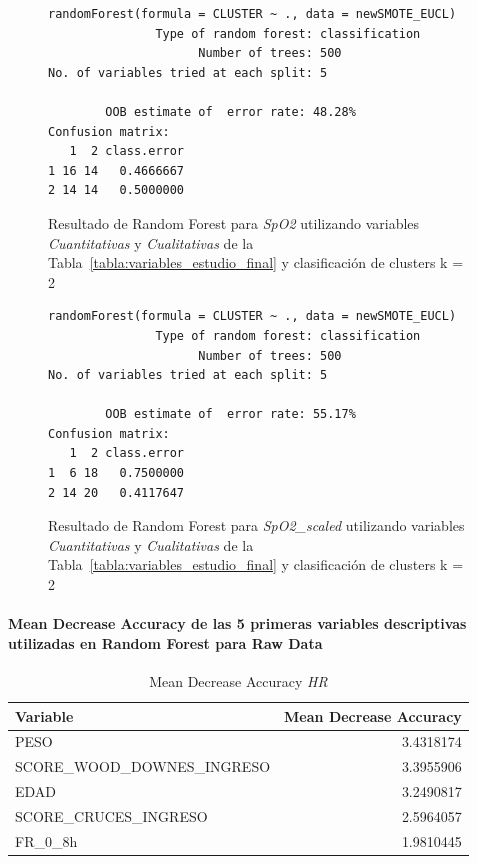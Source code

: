 \begin{figure}[H]
    \centering
    \begin{lstlisting}[frame=single, basicstyle=\small\ttfamily]
        randomForest(formula = CLUSTER ~ ., data = newSMOTE_EUCL) 
               Type of random forest: classification
                     Number of trees: 500
No. of variables tried at each split: 5

        OOB estimate of  error rate: 48.28%
Confusion matrix:
   1  2 class.error
1 16 14   0.4666667
2 14 14   0.5000000
    \end{lstlisting}
    \caption{Resultado de Random Forest para \textit{SpO2} utilizando variables \textit{Cuantitativas} y \textit{Cualitativas} de la Tabla~\ref{tabla:variables_estudio_final} y clasificación de clusters k = 2}\label{fig:random_forest_eucl_result_4}
\end{figure}
\begin{figure}[H]
    \centering
    \begin{lstlisting}[frame=single, basicstyle=\small\ttfamily]
        randomForest(formula = CLUSTER ~ ., data = newSMOTE_EUCL) 
               Type of random forest: classification
                     Number of trees: 500
No. of variables tried at each split: 5

        OOB estimate of  error rate: 55.17%
Confusion matrix:
   1  2 class.error
1  6 18   0.7500000
2 14 20   0.4117647
    \end{lstlisting}
    \caption{Resultado de Random Forest para \textit{SpO2\_scaled} utilizando variables \textit{Cuantitativas} y \textit{Cualitativas} de la Tabla~\ref{tabla:variables_estudio_final} y clasificación de clusters k = 2}
    \label{fig:random_forest_eucl_result_5}
\end{figure}

\paragraph{Mean Decrease Accuracy de las 5 primeras variables descriptivas utilizadas en Random Forest para Raw Data}

\begin{table}[H]
    \centering
    \begin{tabular}{lr}
        \toprule
        \textbf{Variable} & \textbf{Mean Decrease Accuracy} \\
        \midrule
        PESO & 3.4318174 \\
        SCORE\_WOOD\_DOWNES\_INGRESO & 3.3955906 \\
        EDAD & 3.2490817 \\
        SCORE\_CRUCES\_INGRESO & 2.5964057 \\
        FR\_0\_8h & 1.9810445 \\
        \bottomrule
    \end{tabular}
    \caption{Mean Decrease Accuracy \textit{HR}}
\end{table}

